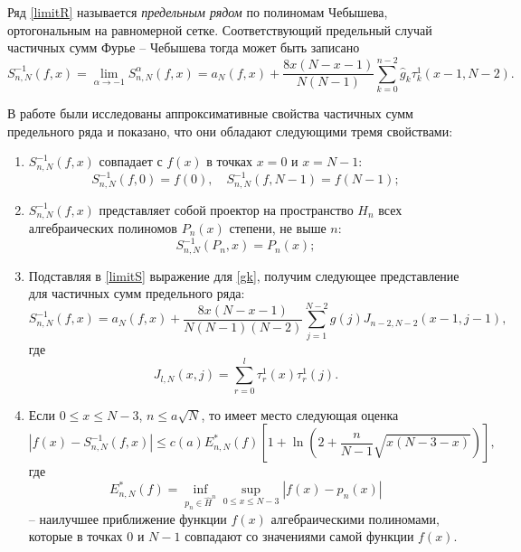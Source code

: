 Ряд \eqref{limitR} называется \textit{предельным рядом } по полиномам Чебышева, ортогональным на равномерной сетке. Соответствующий предельный случай частичных сумм Фурье -- Чебышева тогда может быть записано
\begin{equation}
\label{limitS}
 S_{n,N}^{-1}(f,x) = \lim_{\alpha \rightarrow -1} S_{n,N}^{\alpha}(f,x) =
 a_N(f,x) + \frac{8x(N-x-1)}{N(N-1)} \sum\limits_{k=0}^{n-2} \hat{g}_k \tau_{k}^{1}(x-1,N-2).
\end{equation}

В работе \cite{smsshti1} были исследованы аппроксимативные свойства частичных сумм предельного ряда и показано, что они обладают следующими тремя свойствами:
\begin{enumerate}[1)]
  \item $S_{n,N}^{-1}(f,x)$ совпадает с $f(x)$ в точках $x=0$ и $x=N-1$:%
    \begin{equation}\label{limprop1}
        S_{n,N}^{-1}(f,0) = f(0), \quad S_{n,N}^{-1}(f,N-1)=f(N-1);
    \end{equation}
  \item $S_{n,N}^{-1}(f,x)$ представляет собой проектор на пространство $H_n$ всех алгебраических полиномов $P_n(x)$ степени, не выше $n$:%
    \begin{equation}\label{limprop2}
        S_{n,N}^{-1}(P_n,x) = P_n(x);
    \end{equation}
  \item Подставляя в \eqref{limitS} выражение для \eqref{gk}, получим следующее представление для частичных сумм предельного ряда:
    \begin{equation}
    \label{Sn_jay}
     S_{n,N}^{-1}(f,x) =
     a_N(f,x) + \frac{8x(N-x-1)}{N(N-1)(N-2)} \sum\limits_{j=1}^{N-2} g(j) J_{n-2,N-2}(x-1,j-1) ,
    \end{equation}
    где
    \begin{equation}\label{Jay}
      J_{l,N}(x,j) = \sum_{r=0}^{l} \tau^{1}_{r}(x) \tau^{1}_{r}(j).
    \end{equation}

  \item Если $0\le x\le N-3$, $n\le a\sqrt{N}$, то имеет место следующая оценка
    \begin{equation}\label{applimitR}
        |f(x)-S_{n,N}^{-1}(f,x)|\le c(a)E_{n,N}^{*}(f)\left[1+\ln\left(2+\frac{n}{N-1}\sqrt{x(N-3-x)}\right)\right],
    \end{equation}
    где
    $$E_{n,N}^{*}(f) = \inf_{p_n \in \hat{H}^n} \sup_{0\le x\le N-3} |f(x)-p_n(x)|$$
    -- наилучшее приближение функции $f(x)$ алгебраическими полиномами, которые в точках $0$ и $N-1$ совпадают со значениями самой функции $f(x)$.


\end{enumerate}
